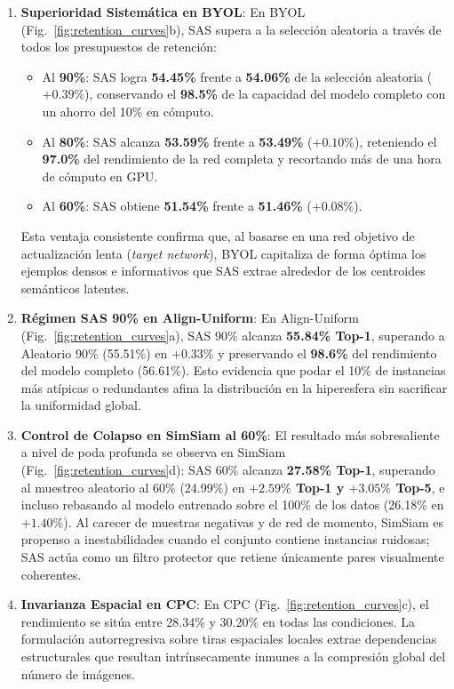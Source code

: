 \begin{enumerate}
    \item \textbf{Superioridad Sistemática en BYOL}:
    En BYOL (Fig.~\ref{fig:retention_curves}b), SAS supera a la selección aleatoria a través de todos los presupuestos de retención:
    \begin{itemize}
        \item Al \textbf{90\%}: SAS logra \textbf{54.45\%} frente a \textbf{54.06\%} de la selección aleatoria ($+0.39\%$), conservando el \textbf{98.5\%} de la capacidad del modelo completo con un ahorro del 10\% en cómputo.
        \item Al \textbf{80\%}: SAS alcanza \textbf{53.59\%} frente a \textbf{53.49\%} ($+0.10\%$), reteniendo el \textbf{97.0\%} del rendimiento de la red completa y recortando más de una hora de cómputo en GPU.
        \item Al \textbf{60\%}: SAS obtiene \textbf{51.54\%} frente a \textbf{51.46\%} ($+0.08\%$).
    \end{itemize}
    Esta ventaja consistente confirma que, al basarse en una red objetivo de actualización lenta (\textit{target network}), BYOL capitaliza de forma óptima los ejemplos densos e informativos que SAS extrae alrededor de los centroides semánticos latentes.

    \item \textbf{Régimen SAS 90\% en Align-Uniform}:
    En Align-Uniform (Fig.~\ref{fig:retention_curves}a), SAS 90\% alcanza \textbf{55.84\% Top-1}, superando a Aleatorio 90\% (55.51\%) en $+0.33\%$ y preservando el \textbf{98.6\%} del rendimiento del modelo completo (56.61\%). Esto evidencia que podar el 10\% de instancias más atípicas o redundantes afina la distribución en la hiperesfera sin sacrificar la uniformidad global.

    \item \textbf{Control de Colapso en SimSiam al 60\%}:
    El resultado más sobresaliente a nivel de poda profunda se observa en SimSiam (Fig.~\ref{fig:retention_curves}d): SAS 60\% alcanza \textbf{27.58\% Top-1}, superando al muestreo aleatorio al 60\% (24.99\%) en \textbf{$+2.59\%$ Top-1 y $+3.05\%$ Top-5}, e incluso rebasando al modelo entrenado sobre el 100\% de los datos (26.18\% en $+1.40\%$). Al carecer de muestras negativas y de red de momento, SimSiam es propenso a inestabilidades cuando el conjunto contiene instancias ruidosas; SAS actúa como un filtro protector que retiene únicamente pares visualmente coherentes.

    \item \textbf{Invarianza Espacial en CPC}:
    En CPC (Fig.~\ref{fig:retention_curves}c), el rendimiento se sitúa entre 28.34\% y 30.20\% en todas las condiciones. La formulación autorregresiva sobre tiras espaciales locales extrae dependencias estructurales que resultan intrínsecamente inmunes a la compresión global del número de imágenes.
\end{enumerate}

